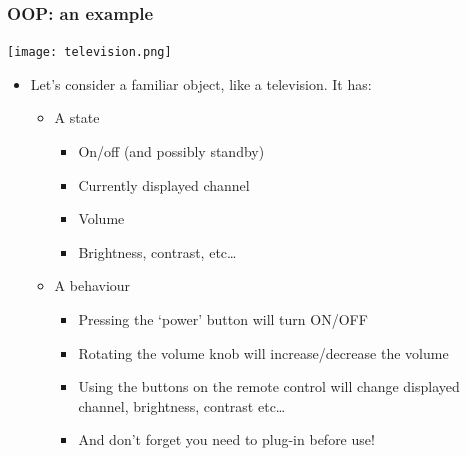\documentclass[9pt]{beamer}
\begin{document}
\begin{frame}
  \frametitle{OOP: an example}
  \centering\texttt{[image: television.png]}

  \medskip

  \begin{itemize}
  \item Let's consider a familiar object, like a television. It has:
    \smallskip
    \begin{itemize}
    \item A state
      \begin{itemize}
      \item On/off (and possibly standby)
      \item Currently displayed channel
      \item Volume
      \item Brightness, contrast, etc\dots
      \end{itemize}

    \medskip

    \item A behaviour
      \smallskip
      \begin{itemize}
      \item Pressing the `power' button will turn ON/OFF
      \item Rotating the volume knob will increase/decrease the volume
      \item Using the buttons on the remote control will change displayed
            channel, brightness, contrast etc\dots
      \item And don't forget you need to plug-in before use!
      \end{itemize}
    \end{itemize}
  \end{itemize}

\end{frame}
\end{document}
